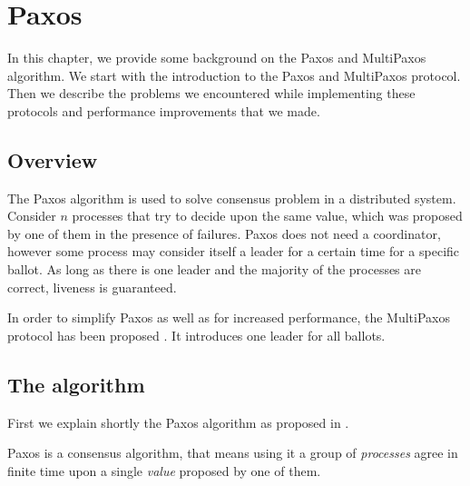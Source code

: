 \chapter{Paxos}

In this chapter, we provide some background on the Paxos and MultiPaxos algorithm. We start with the introduction to the Paxos and MultiPaxos protocol. Then we describe the problems we encountered while implementing these protocols and performance improvements that we made.

\section{Overview}
The Paxos algorithm is used to solve consensus problem in a distributed system. Consider $n$ processes that try to decide upon the same value, which was proposed by one of them in the presence of failures. Paxos does not need a coordinator, however some process may consider itself a leader for a certain time for a specific ballot. As long as there is one leader and the majority of the processes are correct, liveness is guaranteed.

In order to simplify Paxos as well as for increased performance, the MultiPaxos protocol has been proposed \cite{Lam01}. It introduces one leader for all ballots.

\section{The algorithm}
First we explain shortly the Paxos algorithm as proposed in \cite{Lam98}.

Paxos is a consensus algorithm, that means using it a group of \textit{processes} agree in finite time upon a single \textit{value} proposed by one of them.

